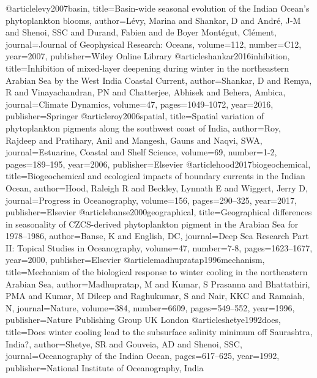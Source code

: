 @article{levy2007basin,
	title={Basin-wide seasonal evolution of the Indian Ocean's phytoplankton blooms},
	author={L{\'e}vy, Marina and Shankar, D and Andr{\'e}, J-M and Shenoi, SSC and Durand, Fabien and de Boyer Mont{\'e}gut, Cl{\'e}ment},
	journal={Journal of Geophysical Research: Oceans},
	volume={112},
	number={C12},
	year={2007},
	publisher={Wiley Online Library}
}
@article{shankar2016inhibition,
	title={Inhibition of mixed-layer deepening during winter in the northeastern Arabian Sea by the West India Coastal Current},
	author={Shankar, D and Remya, R and Vinayachandran, PN and Chatterjee, Abhisek and Behera, Ambica},
	journal={Climate Dynamics},
	volume={47},
	pages={1049--1072},
	year={2016},
	publisher={Springer}
}
@article{roy2006spatial,
	title={Spatial variation of phytoplankton pigments along the southwest coast of India},
	author={Roy, Rajdeep and Pratihary, Anil and Mangesh, Gauns and Naqvi, SWA},
	journal={Estuarine, Coastal and Shelf Science},
	volume={69},
	number={1-2},
	pages={189--195},
	year={2006},
	publisher={Elsevier}
}
@article{hood2017biogeochemical,
	title={Biogeochemical and ecological impacts of boundary currents in the Indian Ocean},
	author={Hood, Raleigh R and Beckley, Lynnath E and Wiggert, Jerry D},
	journal={Progress in Oceanography},
	volume={156},
	pages={290--325},
	year={2017},
	publisher={Elsevier}
}
@article{banse2000geographical,
	title={Geographical differences in seasonality of CZCS-derived phytoplankton pigment in the Arabian Sea for 1978--1986},
	author={Banse, K and English, DC},
	journal={Deep Sea Research Part II: Topical Studies in Oceanography},
	volume={47},
	number={7-8},
	pages={1623--1677},
	year={2000},
	publisher={Elsevier}
}
@article{madhupratap1996mechanism,
	title={Mechanism of the biological response to winter cooling in the northeastern Arabian Sea},
	author={Madhupratap, M and Kumar, S Prasanna and Bhattathiri, PMA and Kumar, M Dileep and Raghukumar, S and Nair, KKC and Ramaiah, N},
	journal={Nature},
	volume={384},
	number={6609},
	pages={549--552},
	year={1996},
	publisher={Nature Publishing Group UK London}
}
@article{shetye1992does,
	title={Does winter cooling lead to the subsurface salinity minimum off Saurashtra, India?},
	author={Shetye, SR and Gouveia, AD and Shenoi, SSC},
	journal={Oceanography of the Indian Ocean},
	pages={617--625},
	year={1992},
	publisher={National Institute of Oceanography, India}
}

